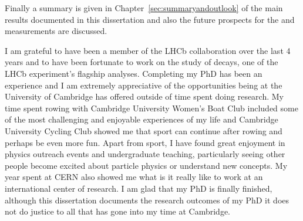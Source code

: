 Finally a summary is given in Chapter~\ref{sec:summaryandoutlook} of the main results documented in this dissertation and also the future prospects for the \BF and \el measurements are discussed. 

I am grateful to have been a member of the LHCb collaboration over the last 4 years and to have been fortunate to work on the study of \bmumu decays, one of the LHCb experiment's flagship analyses. Completing my PhD has been an experience and I am extremely appreciative of the opportunities being at the University of Cambridge has offered outside of time spent doing research. My time spent rowing with Cambridge University Women's Boat Club included some of the most challenging and enjoyable experiences of my life and Cambridge University Cycling Club showed me that sport can continue after rowing and perhaps be even more fun. 
Apart from sport, I have found great enjoyment in physics outreach events and undergraduate teaching, particularly seeing other people become excited about particle physics or understand new concepts. My year spent at CERN also showed me what is it really like to work at an international center of research. I am glad that my PhD is finally finished, although this dissertation documents the research outcomes of my PhD it does not do justice to all that has gone into my time at Cambridge.
